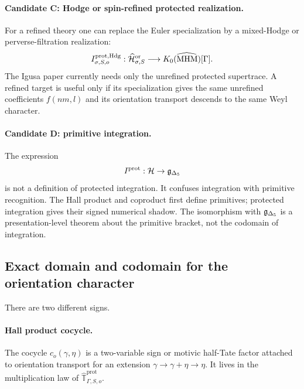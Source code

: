 \paragraph{Candidate C: Hodge or spin-refined protected realization.}
For a refined theory one can replace the Euler specialization by a
mixed-Hodge or perverse-filtration realization:
\[
  I^{\mathrm{prot,Hdg}}_{\sigma,S,o}:
  \widehat{\mathcal H}^{\mathrm{or}}_{\sigma,S}
  \longrightarrow
  \widehat{K_0(\operatorname{MHM})[\Gamma]}.
\]
The Igusa paper currently needs only the unrefined protected
supertrace.  A refined target is useful only if its specialization gives
the same unrefined coefficients \(f(nm,l)\) and its orientation
transport descends to the same Weyl character.

\paragraph{Candidate D: primitive integration.}
The expression
\[
  I^{\mathrm{prot}}:\mathcal H\to \mathfrak g_{\Delta_5}
\]
is not a definition of protected integration.  It confuses integration
with primitive recognition.  The Hall product and coproduct first define
primitives; protected integration gives their signed numerical shadow.
The isomorphism with \(\mathfrak g_{\Delta_5}\) is a presentation-level theorem about
the primitive bracket, not the codomain of integration.

\subsection{Exact domain and codomain for the orientation character}

There are two different signs.

\paragraph{Hall product cocycle.}
The cocycle \(c_o(\gamma,\eta)\) is a two-variable sign or motivic
half-Tate factor attached to orientation transport for an extension
\(\gamma\to\gamma+\eta\to\eta\).  It lives in the multiplication law of
\(\widehat{\mathbb T}^{\mathrm{prot}}_{\Gamma,S,o}\).

